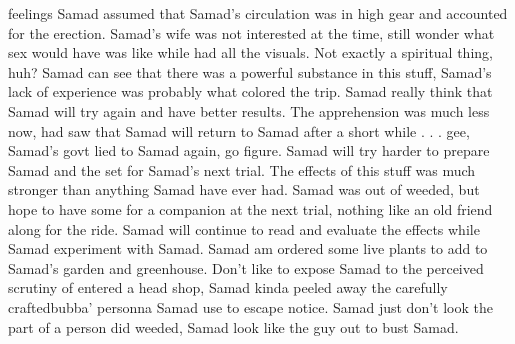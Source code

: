 \documentclass[12pt]{book}
\begin{document}
feelings Samad assumed that Samad's circulation was in high gear and accounted for the erection. Samad's wife was not interested at the time, still wonder what sex would have was like while had all the visuals. Not exactly a spiritual thing, huh? Samad can see that there was a powerful substance in this stuff, Samad's lack of experience was probably what colored the trip. Samad really think that Samad will try again and have better results. The apprehension was much less now, had saw that Samad will return to Samad after a short while . . .  gee, Samad's govt lied to Samad again, go figure. Samad will try harder to prepare Samad and the set for Samad's next trial. The effects of this stuff was much stronger than anything Samad have ever had. Samad was out of weeded, but hope to have some for a companion at the next trial, nothing like an old friend along for the ride. Samad will continue to read and evaluate the effects while Samad experiment with Samad. Samad am ordered some live plants to add to Samad's garden and greenhouse. Don't like to expose Samad to the perceived scrutiny of entered a head shop, Samad kinda peeled away the carefully craftedbubba' personna Samad use to escape notice. Samad just don't look the part of a person did weeded, Samad look like the guy out to bust Samad.
\end{document}
